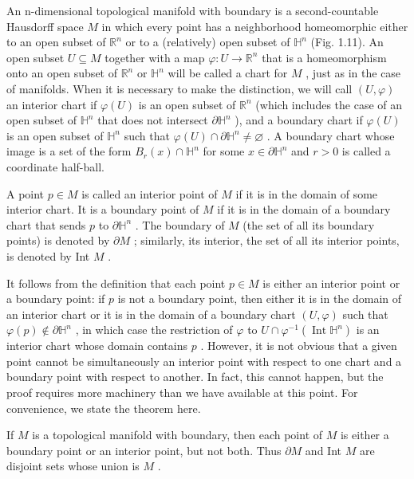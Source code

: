 \begin{definition}
An n-dimensional topological manifold with boundary is a second-countable Hausdorff space $M$ in which every point has a neighborhood homeomorphic either to an open subset of ${\mathbb{R}}^{n}$ or to a (relatively) open subset of ${\mathbb{H}}^{n}$ (Fig. 1.11). An open subset $U \subseteq  M$ together with a map $\varphi  : U \rightarrow  {\mathbb{R}}^{n}$ that is a homeomorphism onto an open subset of ${\mathbb{R}}^{n}$ or ${\mathbb{H}}^{n}$ will be called a chart for $M$ , just as in the case of manifolds. When it is necessary to make the distinction, we will call $\left( {U,\varphi }\right)$ an interior chart if $\varphi \left( U\right)$ is an open subset of ${\mathbb{R}}^{n}$ (which includes the case of an open subset of ${\mathbb{H}}^{n}$ that does not intersect $\partial {\mathbb{H}}^{n}$ ), and a boundary chart if $\varphi \left( U\right)$ is an open subset of ${\mathbb{H}}^{n}$ such that $\varphi \left( U\right)  \cap  \partial {\mathbb{H}}^{n} \neq  \varnothing$ . A boundary chart whose image is a set of the form ${B}_{r}\left( x\right)  \cap  {\mathbb{H}}^{n}$ for some $x \in  \partial {\mathbb{H}}^{n}$ and $r > 0$ is called a coordinate half-ball.

A point $p \in  M$ is called an interior point of $M$ if it is in the domain of some interior chart. It is a boundary point of $M$ if it is in the domain of a boundary chart that sends $p$ to $\partial {\mathbb{H}}^{n}$ . The boundary of $M$ (the set of all its boundary points) is denoted by $\partial M$ ; similarly, its interior, the set of all its interior points, is denoted by Int $M$ .

It follows from the definition that each point $p \in  M$ is either an interior point or a boundary point: if $p$ is not a boundary point, then either it is in the domain of an interior chart or it is in the domain of a boundary chart $\left( {U,\varphi }\right)$ such that $\varphi \left( p\right)  \notin  \partial {\mathbb{H}}^{n}$ , in which case the restriction of $\varphi$ to $U \cap  {\varphi }^{-1}\left( {\operatorname{Int}{\mathbb{H}}^{n}}\right)$ is an interior chart whose domain contains $p$ . However, it is not obvious that a given point cannot be simultaneously an interior point with respect to one chart and a boundary point with respect to another. In fact, this cannot happen, but the proof requires more machinery than we have available at this point. For convenience, we state the theorem here.
\end{definition}

\begin{theorem}
\label{thm:1-37}
\mathlibok
{}
If $M$ is a topological manifold with boundary, then each point of $M$ is either a boundary point or an interior point, but not both. Thus $\partial M$ and Int $M$ are disjoint sets whose union is $M$ .
\end{theorem}


